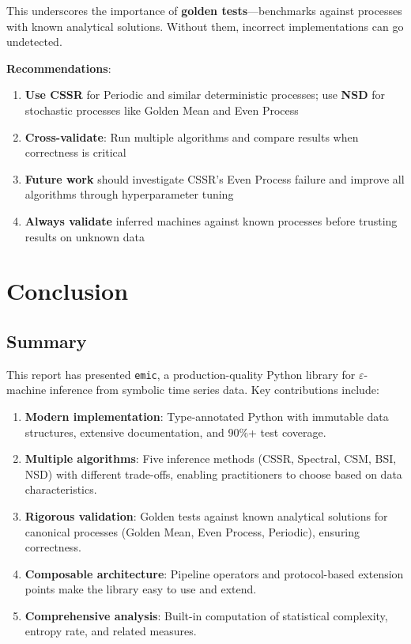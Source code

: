 \documentclass[11pt,a4paper]{report}
\theoremstyle{definition}
\theoremstyle{plain}
\newcommand{\eps}{\varepsilon}
\newcommand{\emic}{\texttt{emic}}
\begin{document}
This underscores the importance of \textbf{golden tests}---benchmarks against processes with known analytical solutions. Without them, incorrect implementations can go undetected.

\textbf{Recommendations}:
\begin{enumerate}
    \item \textbf{Use CSSR} for Periodic and similar deterministic processes; use \textbf{NSD} for stochastic processes like Golden Mean and Even Process
    \item \textbf{Cross-validate}: Run multiple algorithms and compare results when correctness is critical
    \item \textbf{Future work} should investigate CSSR's Even Process failure and improve all algorithms through hyperparameter tuning
    \item \textbf{Always validate} inferred machines against known processes before trusting results on unknown data
\end{enumerate}

\chapter{Conclusion}
\label{ch:conclusion}

\section{Summary}

This report has presented \emic{}, a production-quality Python library for $\eps$-machine inference from symbolic time series data. Key contributions include:

\begin{enumerate}
    \item \textbf{Modern implementation}: Type-annotated Python with immutable data structures, extensive documentation, and 90\%+ test coverage.

    \item \textbf{Multiple algorithms}: Five inference methods (CSSR, Spectral, CSM, BSI, NSD) with different trade-offs, enabling practitioners to choose based on data characteristics.

    \item \textbf{Rigorous validation}: Golden tests against known analytical solutions for canonical processes (Golden Mean, Even Process, Periodic), ensuring correctness.

    \item \textbf{Composable architecture}: Pipeline operators and protocol-based extension points make the library easy to use and extend.

    \item \textbf{Comprehensive analysis}: Built-in computation of statistical complexity, entropy rate, and related measures.
\end{enumerate}
\end{document}
